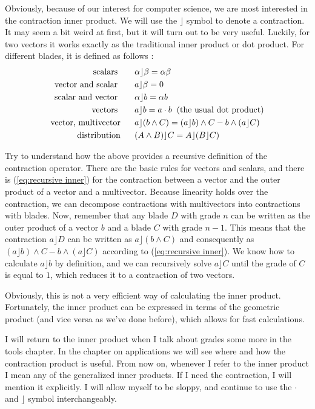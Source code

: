 \documentclass[10pt]{report}
\begin{document}
Obviously, because of our interest for computer science, we are
most interested in the contraction inner product. We will use the
$\rfloor$ symbol to denote a contraction. It may seem a bit weird
at first, but it will turn out to be very useful. Luckily, for two
vectors it works exactly as the traditional inner product or dot
product. For different blades, it is defined as follows
\cite{bib:dorst part 1}:
\begin{alignat}{2}
    \text{scalars           \;\;\;\;\;\;}&\alpha \rfloor \beta = \alpha \beta \\
    \text{vector and scalar \;\;\;\;\;\;}&a \rfloor \beta = 0                 \\
    \text{scalar and vector \;\;\;\;\;\;}&\alpha \rfloor b = \alpha b         \\
    \text{vectors \;\;\;\;\;\;}&a \rfloor b = a \cdot b \;\;\text{(the usual dot product)}  \\
    \text{vector, multivector\;\;\;\;\;\;}&a \rfloor (b \wedge C) = (a \rfloor b)\wedge C - b\wedge (a \rfloor C) \label{eq:recursive inner} \\
    \text{distribution\;\;\;\;\;\;}&(A \wedge B)\rfloor C = A\rfloor(B\rfloor C)
\end{alignat}

Try to understand how the above provides a recursive definition of
the contraction operator. There are the basic rules for vectors
and scalars, and there is (\ref{eq:recursive inner}) for the
contraction between a vector and the outer product of a vector and
a multivector. Because linearity holds over the contraction, we
can decompose contractions with multivectors into contractions
with blades. Now, remember that any blade $D$ with grade $n$ can
be written as the outer product of a vector $b$ and a blade $C$
with grade $n-1$. This means that the contraction $a\rfloor D$ can
be written as $a\rfloor (b\wedge C)$ and consequently as $(a
\rfloor b)\wedge C - b\wedge (a \rfloor C)$ according to
(\ref{eq:recursive inner}). We know how to calculate $a\rfloor b$
by definition, and we can recursively solve $a\rfloor C$ until the
grade of $C$ is equal to $1$, which reduces it to a contraction of
two vectors.

Obviously, this is not a very efficient way of calculating the
inner product. Fortunately, the inner product can be expressed in
terms of the geometric product (and vice versa as we've done
before), which allows for fast calculations. \cite{bib:suter c++
implementation}

I will return to the inner product when I talk about grades some
more in the tools chapter. In the chapter on applications we will
see where and how the contraction product is useful. From now on,
whenever I refer to the inner product I mean any of the
generalized inner products. If I need the contraction, I will
mention it explicitly. I will allow myself to be sloppy, and
continue to use the $\cdot$ and $\rfloor$ symbol interchangeably.
\end{document}

